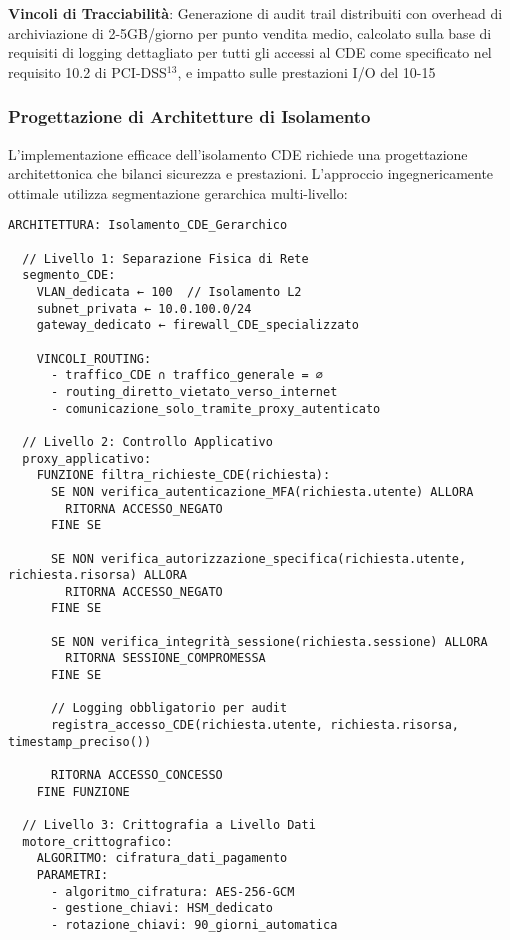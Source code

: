 {\textbf{Vincoli di Tracciabilità}: Generazione di audit trail distribuiti con overhead di archiviazione di 2-5GB/giorno per punto vendita medio, calcolato sulla base di requisiti di logging dettagliato per tutti gli accessi al CDE come specificato nel requisito 10.2 di PCI-DSS$^{13}$, e impatto sulle prestazioni I/O del 10-15%

\subsubsection{Progettazione di Architetture di Isolamento}

L'implementazione efficace dell'isolamento CDE richiede una progettazione architettonica che bilanci sicurezza e prestazioni. L'approccio ingegnericamente ottimale utilizza segmentazione gerarchica multi-livello:

\begin{verbatim}
ARCHITETTURA: Isolamento_CDE_Gerarchico

  // Livello 1: Separazione Fisica di Rete
  segmento_CDE:
    VLAN_dedicata ← 100  // Isolamento L2
    subnet_privata ← 10.0.100.0/24
    gateway_dedicato ← firewall_CDE_specializzato
    
    VINCOLI_ROUTING:
      - traffico_CDE ∩ traffico_generale = ∅
      - routing_diretto_vietato_verso_internet
      - comunicazione_solo_tramite_proxy_autenticato

  // Livello 2: Controllo Applicativo
  proxy_applicativo:
    FUNZIONE filtra_richieste_CDE(richiesta):
      SE NON verifica_autenticazione_MFA(richiesta.utente) ALLORA
        RITORNA ACCESSO_NEGATO
      FINE SE
      
      SE NON verifica_autorizzazione_specifica(richiesta.utente, richiesta.risorsa) ALLORA
        RITORNA ACCESSO_NEGATO  
      FINE SE
      
      SE NON verifica_integrità_sessione(richiesta.sessione) ALLORA
        RITORNA SESSIONE_COMPROMESSA
      FINE SE
      
      // Logging obbligatorio per audit
      registra_accesso_CDE(richiesta.utente, richiesta.risorsa, timestamp_preciso())
      
      RITORNA ACCESSO_CONCESSO
    FINE FUNZIONE

  // Livello 3: Crittografia a Livello Dati
  motore_crittografico:
    ALGORITMO: cifratura_dati_pagamento
    PARAMETRI:
      - algoritmo_cifratura: AES-256-GCM
      - gestione_chiavi: HSM_dedicato
      - rotazione_chiavi: 90_giorni_automatica
    

\end{verbatim}}
